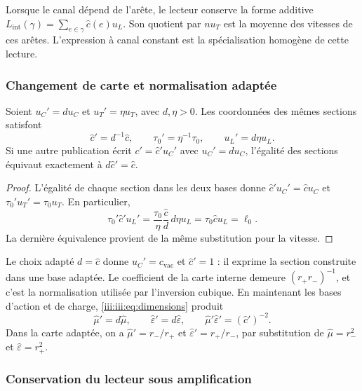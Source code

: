 Lorsque le canal dépend de l’arête, le lecteur conserve la forme additive
$L_{\mathrm{int}}(\gamma)=\sum_{e\in\gamma}\widehat c(e)u_L$.
Son quotient par $nu_T$ est la moyenne des vitesses de ces arêtes.
L’expression à canal constant est la spécialisation homogène de
cette lecture.

\subsubsection{Changement de carte et normalisation adaptée}

\begin{proposition}
Soient $u_C'=d u_C$ et $u_T'=\eta u_T$, avec $d,\eta>0$. Les coordonnées des mêmes sections satisfont
\begin{equation}
 \widehat c'=d^{-1}\widehat c,
 \qquad \tau_0'=\eta^{-1}\tau_0,
 \qquad u_L'=d\eta u_L.
 \label{iii:iii:eq:velocidad-cambio-carta}
\end{equation}
Si une autre publication écrit $c'=\widehat c' u_C'$ avec $u_C'=d u_C$,
l’égalité des sections équivaut exactement à $d\widehat c'=\widehat c$.
\end{proposition}
\begin{proof}
L'égalité de chaque section dans les deux bases donne $\widehat c'u_C'=\widehat c u_C$ et $\tau_0'u_T'=\tau_0u_T$. En particulier,
\[
 \tau_0'\widehat c'u_L'
 =\frac{\tau_0}{\eta}\frac{\widehat c}{d}\,d\eta u_L
 =\tau_0\widehat c u_L=\ell_0.
\]
La dernière équivalence provient de la même substitution pour la vitesse.
\end{proof}

Le choix adapté $d=\widehat c$ donne $u_C'=c_{\mathrm{vac}}$ et
$\widehat c'=1$ : il exprime la section construite dans une base adaptée.
Le coefficient de la carte interne demeure $(r_+r_-)^{-1}$, et c’est
la normalisation utilisée par l’inversion cubique. En maintenant les
bases d’action et de charge, \eqref{iii:iii:eq:dimensions} produit
\[
 \widehat\mu'=d\widehat\mu,\qquad
 \widehat\varepsilon'=d\widehat\varepsilon,\qquad
 \widehat\mu'\widehat\varepsilon'=(\widehat c')^{-2}.
\]
Dans la carte adaptée, on a $\widehat\mu'=r_-/r_+$ et
$\widehat\varepsilon'=r_+/r_-$, par substitution de
$\widehat\mu=r_-^2$ et $\widehat\varepsilon=r_+^2$.

\subsubsection{Conservation du lecteur sous amplification}

